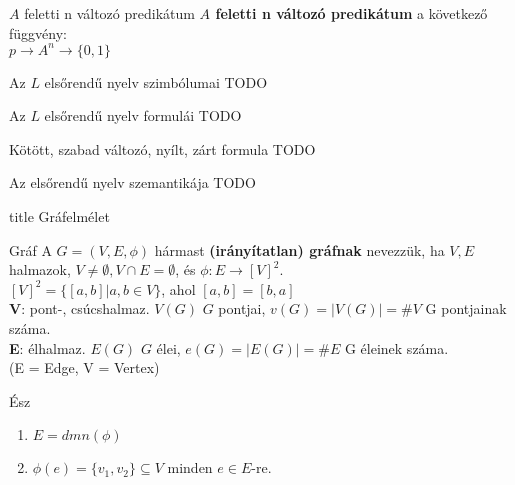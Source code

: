 \documentclass{beamer}
\begin{document}
\begin{frame}

\begin{block}{$A$ feletti n változó predikátum}
\textbf{$A$ feletti n változó predikátum} a következő függvény:\\
$p \rightarrow A^n \rightarrow \{0, 1\}$
\end{block}

\begin{block}{Az $L$ elsőrendű nyelv szimbólumai}
TODO
\end{block}

\begin{block}{Az $L$ elsőrendű nyelv formulái}
TODO
\end{block}

\begin{block}{Kötött, szabad változó, nyílt, zárt formula}
TODO
\end{block}

\begin{block}{Az elsőrendű nyelv szemantikája}
TODO
\end{block}

\end{frame}


\begin{frame}[plain]
\begin{beamercolorbox}[center]{title}
    {\Huge Gráfelmélet}
\end{beamercolorbox}
\end{frame}


\begin{frame}

\begin{block}{Gráf}
A $G = (V, E, {\phi})$ hármast \textbf{(irányítatlan) gráfnak} nevezzük, ha $V, E$ halmazok, $V \neq \emptyset, V \cap E = \emptyset$, és $\phi : E \rightarrow [V]^2$.\\
\bigskip
$[V]^2 = \{ [a, b] | a, b \in V \}$, ahol $[a, b] = [b, a]$\\
\bigskip
\textbf{V}: pont-, csúcshalmaz. $V(G)$ $G$ pontjai, $v(G) = |V(G)| = \#V$ G pontjainak száma.\\
\bigskip
\textbf{E}: élhalmaz. $E(G)$ $G$ élei, $e(G) = |E(G)| = \#E$ G éleinek száma.\\
\bigskip
(E = Edge, V = Vertex)
\end{block}

\begin{block}{Ész}
\begin{enumerate}
\item $E = dmn({\phi})$
\item ${\phi}(e) = \{v_1, v_2\} \subseteq V$ minden $e \in E$-re.
\end{enumerate}
\end{block}

\end{frame}
\end{document}
